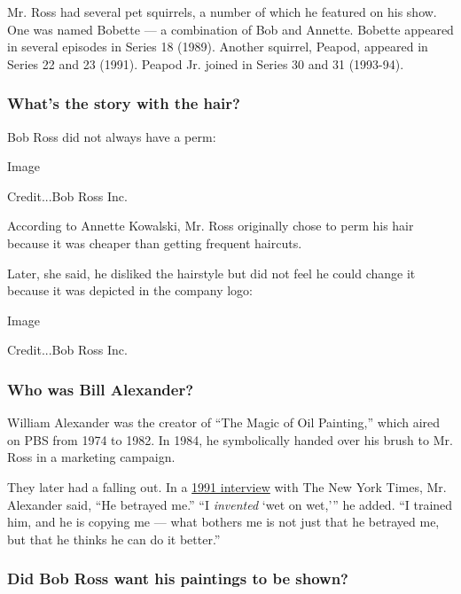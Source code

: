 Mr. Ross had several pet squirrels, a number of which he featured on his
show. One was named Bobette --- a combination of Bob and Annette.
Bobette appeared in several episodes in Series 18 (1989). Another
squirrel, Peapod, appeared in Series 22 and 23 (1991). Peapod Jr. joined
in Series 30 and 31 (1993-94).

\hypertarget{whats-the-story-with-the-hair}{%
\subsubsection{\texorpdfstring{\textbf{What's the story with the
hair?}}{What's the story with the hair?}}\label{whats-the-story-with-the-hair}}

Bob Ross did not always have a perm:

Image

Credit...Bob Ross Inc.

According to Annette Kowalski, Mr. Ross originally chose to perm his
hair because it was cheaper than getting frequent haircuts.

Later, she said, he disliked the hairstyle but did not feel he could
change it because it was depicted in the company logo:

Image

Credit...Bob Ross Inc.

\hypertarget{who-was-bill-alexander}{%
\subsubsection{\texorpdfstring{\textbf{Who was Bill
Alexander?}}{Who was Bill Alexander?}}\label{who-was-bill-alexander}}

William Alexander was the creator of ``The Magic of Oil Painting,''
which aired on PBS from 1974 to 1982. In 1984, he symbolically handed
over his brush to Mr. Ross in a marketing campaign.

They later had a falling out. In a
\href{https://timesmachine.nytimes3xbfgragh.onion/timesmachine/1991/12/22/128191.html?action=click\&contentCollection=Archives\&module=LedeAsset\&region=ArchiveBody\&pgtype=article\&pageNumber=175}{1991
interview} with The New York Times, Mr. Alexander said, ``He betrayed
me.'' ``I \emph{invented} `wet on wet,''' he added. ``I trained him, and
he is copying me --- what bothers me is not just that he betrayed me,
but that he thinks he can do it better.''

\hypertarget{did-bob-ross-want-his-paintings-to-be-shown}{%
\subsubsection{\texorpdfstring{\textbf{Did Bob Ross want his paintings
to be
shown?}}{Did Bob Ross want his paintings to be shown?}}\label{did-bob-ross-want-his-paintings-to-be-shown}}

